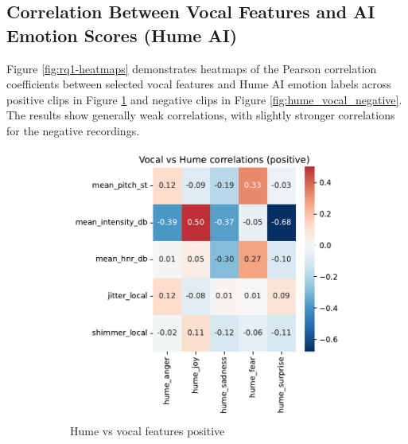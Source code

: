 \subsection{Correlation Between Vocal Features and AI Emotion Scores (Hume AI)}
Figure \ref{fig:rq1-heatmaps} demonstrates heatmaps of the Pearson correlation coefficients between selected vocal features and Hume AI emotion labels across positive clips in Figure \ref{fig:hume_vocal_positive} and negative clips in Figure \ref{fig:hume_vocal_negative}. The results show generally weak correlations, with slightly stronger correlations for the negative recordings.  

\begin{figure}[!h]
    \centering 
    \begin{subfigure}[b]{0.45\textwidth}
        \includegraphics[width=\textwidth]{png/results/rq1_nr3/vocal_vs_hume_correlations_positive.png.pdf}
        \caption{Hume vs vocal features positive}
        \label{fig:hume_vocal_positive}
    \end{subfigure}
    \begin{subfigure}[b]{0.45\textwidth}

\end{subfigure}
\end{figure}
